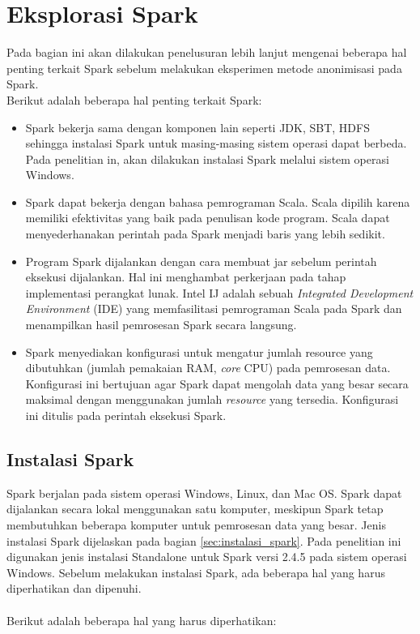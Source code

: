 \begin{enumerate}
\end{enumerate}

\newpage
\section{Eksplorasi Spark}
Pada bagian ini akan dilakukan penelusuran lebih lanjut mengenai beberapa hal penting terkait Spark sebelum melakukan eksperimen metode anonimisasi pada Spark.\\ 

\noindent Berikut adalah beberapa hal penting terkait Spark:
\begin{itemize}

\item Spark bekerja sama dengan komponen lain seperti JDK, SBT, HDFS sehingga instalasi Spark untuk masing-masing sistem operasi dapat berbeda. Pada penelitian in, akan dilakukan instalasi Spark melalui sistem operasi Windows. 

\item Spark dapat bekerja dengan bahasa pemrograman Scala. Scala dipilih karena memiliki efektivitas yang baik pada penulisan kode program. Scala dapat menyederhanakan perintah pada Spark menjadi baris yang lebih sedikit.

\item Program Spark dijalankan dengan cara membuat jar sebelum perintah eksekusi dijalankan. Hal ini menghambat perkerjaan pada tahap implementasi perangkat lunak. Intel IJ adalah sebuah \textit{Integrated Development Environment} (IDE) yang memfasilitasi pemrograman Scala pada Spark dan menampilkan hasil pemrosesan Spark  secara langsung.

\item Spark menyediakan konfigurasi untuk mengatur jumlah resource  yang dibutuhkan (jumlah pemakaian RAM, \textit{core} CPU) pada pemrosesan data. Konfigurasi ini bertujuan agar Spark dapat mengolah data yang besar secara maksimal dengan menggunakan jumlah \textit{resource} yang tersedia. Konfigurasi ini ditulis pada perintah eksekusi Spark.
 

\end{itemize}



\subsection{Instalasi Spark}
Spark berjalan pada sistem operasi Windows, Linux, dan Mac OS. Spark dapat dijalankan secara lokal menggunakan satu komputer, meskipun Spark tetap membutuhkan beberapa komputer untuk pemrosesan data yang besar. Jenis instalasi Spark dijelaskan pada bagian \ref{sec:instalasi_spark}. Pada penelitian ini digunakan jenis instalasi Standalone untuk Spark versi 2.4.5 pada sistem operasi Windows. Sebelum melakukan instalasi Spark, ada beberapa hal yang harus diperhatikan dan dipenuhi. 
\\\\
\noindent Berikut adalah beberapa hal yang harus diperhatikan:

